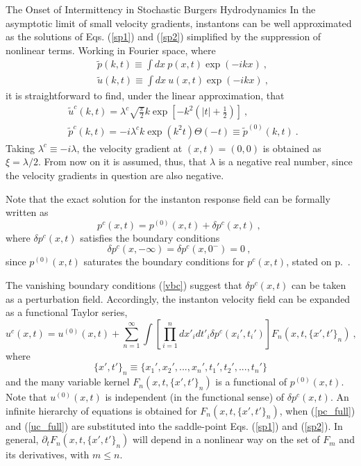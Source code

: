 \begin{chapter}{The Onset of Intermittency in Stochastic Burgers Hydrodynamics}
In the asymptotic limit of small velocity gradients, instantons can be well approximated as the solutions of Eqs. (\ref{sp1}) and (\ref{sp2}) simplified by the suppression of nonlinear terms. Working in Fourier space, where
\begin{align}
& \tilde p(k,t) \equiv \int dx \ p(x,t) \exp(-ikx) \ , \ \label{fp} \\
& \tilde u(k,t) \equiv \int dx \ u(x,t) \exp(-ikx) \ , \ \label{fu}
\end{align}
it is straightforward to find, under the linear approximation, that
\begin{align}
& \tilde u^c(k,t) = \lambda^c \sqrt{\frac{\pi}{2}} k \exp \left [ -k^2\left (|t|+\frac{1}{2} \right ) \right ]  \label{fuc}  \ , \ \\
& \tilde p^c(k,t) = -i  \lambda^c k \exp( k^2 t) \Theta(-t) \equiv \tilde p^{(0)}(k,t) \ . \ \label{fpc}
\end{align}
Taking $\lambda^c \equiv -i \lambda$, the velocity gradient at $(x,t)=(0,0)$ is obtained as $\xi = \lambda /2$. From now on it is assumed, thus, that $\lambda$ is a negative real number, since the velocity gradients in question are also negative.

Note that the exact solution for the instanton response field can be formally written as
\begin{equation}
p^c(x,t) = p^{(0)}(x,t) + \delta p^c(x,t) \ , \ \label{pc_full}
\end{equation}
where $\delta p^c(x,t)$ satisfies the boundary conditions
\begin{equation}
\delta p^c (x,- \infty) = \delta p^c(x,0^-) = 0 \ , \ \label{vbc}
\end{equation}
since $p^{(0)}(x,t)$ saturates the boundary conditions for $p^c(x,t)$, stated on p.~\pageref{burgers-boundary}.

The vanishing boundary conditions (\ref{vbc}) suggest that $\delta p^c(x,t)$ can be taken as a perturbation field. Accordingly, the instanton velocity field can be expanded as a functional Taylor series,
\begin{equation}
u^c(x,t) = u^{(0)}(x,t) + \sum_{n=1}^\infty \int \left [ \prod_{i=1}^n dx'_i dt'_i \delta p^c(x_i',t_i') \right ] F_n(x,t, \{x',t'\}_n )  \ , \ \label{uc_full}
\end{equation}
where
\begin{equation}
\{x',t'\}_n \equiv \{ x_1',x_2',...,x_n', t_1', t_2',...,t_n' \}
\end{equation}
and the many variable kernel $F_n(x,t, \{x',t'\}_n )$ is a functional of $p^{(0)}(x,t)$. Note that $u^{(0)}(x,t)$ is independent
(in the functional sense) of $\delta p^c(x,t)$. An infinite hierarchy of equations is obtained for $F_n(x,t, \{x',t'\}_n )$, when (\ref{pc_full}) and (\ref{uc_full})
are substituted into the saddle-point Eqs. (\ref{sp1}) and (\ref{sp2}). In general, $\partial_t F_n(x,t, \{x',t'\}_n )$ will depend in a nonlinear way on the set of $F_m$ and its derivatives, with $m \leq n$.


\end{chapter}

